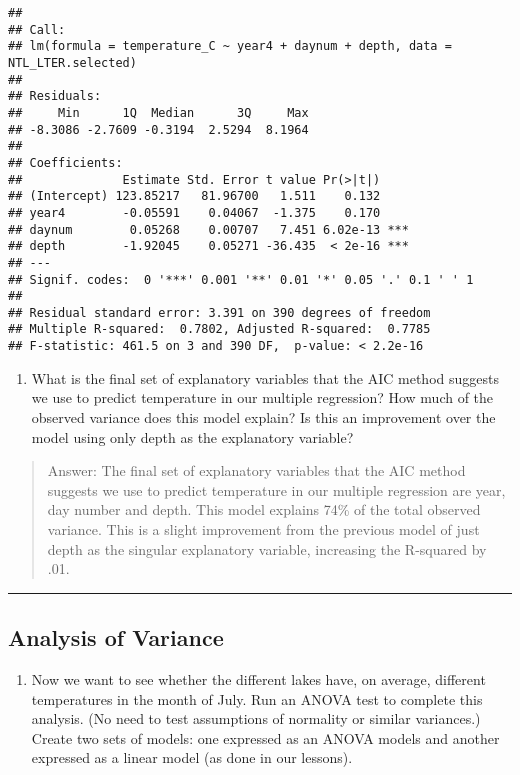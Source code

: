 \documentclass[
]{article}
\providecommand{\tightlist}{%
  \setlength{\itemsep}{0pt}\setlength{\parskip}{0pt}}
\begin{document}
\begin{verbatim}
## 
## Call:
## lm(formula = temperature_C ~ year4 + daynum + depth, data = NTL_LTER.selected)
## 
## Residuals:
##     Min      1Q  Median      3Q     Max 
## -8.3086 -2.7609 -0.3194  2.5294  8.1964 
## 
## Coefficients:
##              Estimate Std. Error t value Pr(>|t|)    
## (Intercept) 123.85217   81.96700   1.511    0.132    
## year4        -0.05591    0.04067  -1.375    0.170    
## daynum        0.05268    0.00707   7.451 6.02e-13 ***
## depth        -1.92045    0.05271 -36.435  < 2e-16 ***
## ---
## Signif. codes:  0 '***' 0.001 '**' 0.01 '*' 0.05 '.' 0.1 ' ' 1
## 
## Residual standard error: 3.391 on 390 degrees of freedom
## Multiple R-squared:  0.7802, Adjusted R-squared:  0.7785 
## F-statistic: 461.5 on 3 and 390 DF,  p-value: < 2.2e-16
\end{verbatim}

\begin{enumerate}
\def\labelenumi{\arabic{enumi}.}
\setcounter{enumi}{10}
\tightlist
\item
  What is the final set of explanatory variables that the AIC method
  suggests we use to predict temperature in our multiple regression? How
  much of the observed variance does this model explain? Is this an
  improvement over the model using only depth as the explanatory
  variable?
\end{enumerate}

\begin{quote}
Answer: The final set of explanatory variables that the AIC method
suggests we use to predict temperature in our multiple regression are
year, day number and depth. This model explains 74\% of the total
observed variance. This is a slight improvement from the previous model
of just depth as the singular explanatory variable, increasing the
R-squared by .01.
\end{quote}

\begin{center}\rule{0.5\linewidth}{0.5pt}\end{center}

\hypertarget{analysis-of-variance}{%
\subsection{Analysis of Variance}\label{analysis-of-variance}}

\begin{enumerate}
\def\labelenumi{\arabic{enumi}.}
\setcounter{enumi}{11}
\tightlist
\item
  Now we want to see whether the different lakes have, on average,
  different temperatures in the month of July. Run an ANOVA test to
  complete this analysis. (No need to test assumptions of normality or
  similar variances.) Create two sets of models: one expressed as an
  ANOVA models and another expressed as a linear model (as done in our
  lessons).
\end{enumerate}
\end{document}
